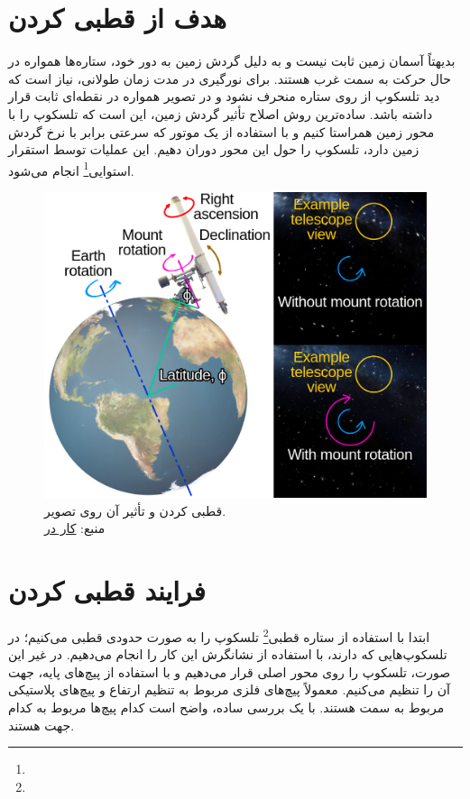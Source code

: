 \documentclass[12pt,a4paper]{article}
\begin{document}
	\section{هدف از قطبی کردن}
	بدیهتاً آسمان زمین ثابت نیست و به دلیل گردش زمین به دور خود، ستاره‌ها همواره در حال حرکت به سمت غرب هستند. برای
	نورگیری در مدت زمان طولانی، نیاز است که دید تلسکوپ از روی ستاره منحرف نشود و در تصویر همواره در نقطه‌ای ثابت قرار
	داشته باشد. ساده‌ترین روش اصلاح تأثیر گردش زمین، این است که تلسکوپ را با محور زمین همراستا کنیم و با استفاده از یک
	موتور که سرعتی برابر با نرخ گردش زمین دارد، تلسکوپ را حول این محور دوران دهیم. این عملیات توسط استقرار
	استوایی\footnote{} انجام می‌شود.
	\begin{figure}[h!]
		\centering
		\includegraphics[width=0.9\linewidth]{Equatorial_mount}
		\caption{قطبی کردن و تأثیر آن روی تصویر.\\منبع:
			\href{https://en.wikipedia.org/wiki/File:Equatorial_mount.svg}{کار  در }}
	\end{figure}
	\section{فرایند قطبی کردن}
	ابتدا با استفاده از ستاره قطبی\footnote{} تلسکوپ را به صورت حدودی قطبی می‌کنیم؛ در تلسکوپ‌هایی
	که  دارند، با استفاده از نشانگرش این کار را انجام می‌دهیم. در غیر این صورت، تلسکوپ را روی محور اصلی
	قرار می‌دهیم و با استفاده از پیچ‌های پایه، جهت آن را تنظیم می‌کنیم. معمولاً پیچ‌های فلزی مربوط به تنظیم ارتفاع
	و پیچ‌های پلاستیکی مربوط به سمت هستند. با یک بررسی ساده، واضح است کدام پیچ‌ها مربوط به کدام جهت هستند.
	
\end{document}
